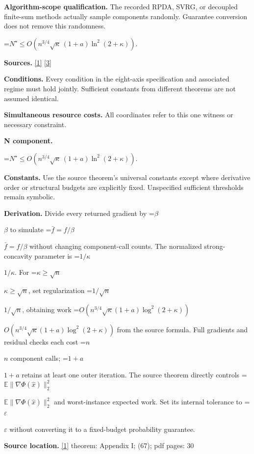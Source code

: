 \documentclass[10pt,a4paper]{article}
\newcommand{\AtlasMath}[1]{\par\begingroup\centering\setbox0=\hbox{$\displaystyle #1$}\ifdim\wd0>1.4\linewidth\typeout{ATLAS WIDE FORMULA: \the\wd0}\fi\ifdim\wd0>\linewidth\resizebox{\linewidth}{!}{\box0}\else\box0\fi\par\endgroup}
\newcommand{\AtlasInlineMath}[1]{\begingroup\setbox0=\hbox{$#1$}\ifdim\wd0>.4\linewidth\endgroup\AtlasMath{#1}\else\endgroup$#1$\fi}
\begin{document}
\textbf{Algorithm-scope qualification.} The recorded RPDA, SVRG, or decoupled finite-sum methods actually sample components randomly. Guarantee conversion does not remove this randomness.



\AtlasMath{N^\star\le O\!\left(n^{3/4}\sqrt\kappa\,(1+a)\ln^2(2+\kappa)\right).}


\textbf{Sources.} \href{https://arxiv.org/pdf/2610.04944v1}{[1]} \href{https://arxiv.org/pdf/2103.15888v1}{[3]}



\textbf{Conditions.} Every condition in the eight-axis specification and associated regime must hold jointly. Sufficient constants from different theorems are not assumed identical.



\textbf{Simultaneous resource costs.} All coordinates refer to this one witness or necessary constraint.



\textbf{N component.}



\AtlasMath{N^\star\le O\!\left(n^{3/4}\sqrt\kappa\,(1+a)\ln^2(2+\kappa)\right).}


\textbf{Constants.} Use the source theorem’s universal constants except where derivative order or structural budgets are explicitly fixed. Unspecified sufficient thresholds remain symbolic.



\textbf{Derivation.} Divide every returned gradient by \AtlasInlineMath{\beta} to simulate \AtlasInlineMath{\bar f=f/\beta} without changing component-call counts. The normalized strong-concavity parameter is \AtlasInlineMath{1/\kappa}. For \AtlasInlineMath{\kappa\ge\sqrt n}, set regularization \AtlasInlineMath{1/\sqrt n}, obtaining work \AtlasInlineMath{O(n^{3/4}\sqrt\kappa(1+a)\log^2(2+\kappa))} from the source formula. Full gradients and residual checks each cost \AtlasInlineMath{n} component calls; \AtlasInlineMath{1+a} retains at least one outer iteration. The source theorem directly controls \AtlasInlineMath{\mathbb E\|\nabla\Phi(\widehat x)\|_2^2} and worst-instance expected work. Set its internal tolerance to \AtlasInlineMath{\varepsilon} without converting it to a fixed-budget probability guarantee.



\textbf{Source location.} \href{https://arxiv.org/pdf/2610.04944v1}{[1]} theorem: Appendix I; (67); pdf pages: 30
\end{document}
